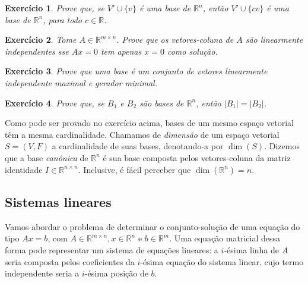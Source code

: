 \documentclass[]{article}
\newtheorem{exercicio}{Exercício}
\numberwithin{equation}{section}
\begin{document}
\begin{exercicio}
	Prove que, se $V' \cup \{v\}$ é uma base de $\mathbb{R}^n$, então $V' \cup \{cv\}$ é uma base de $\mathbb{R}^n$, para todo $c \in \mathbb{R}$.
\end{exercicio}

\begin{exercicio}
	Tome $A \in \mathbb{R}^{m \times n}$. Prove que os vetores-coluna de $A$ são linearmente independentes sse $Ax = 0$ tem apenas $x = 0$ como solução.
\end{exercicio}

\begin{exercicio}
	Prove que uma base é um conjunto de vetores linearmente independente maximal e gerador minimal.
\end{exercicio}

\begin{exercicio}
	Prove que, se $B_1$ e $B_2$ são bases de $\mathbb{R}^n$, então $|B_1| = |B_2|$.
\end{exercicio}

Como pode ser provado no exercício acima, bases de um mesmo espaço vetorial têm a mesma cardinalidade. Chamamos de \emph{dimensão} de um espaço vetorial $S = (V, F)$ a cardinalidade de suas bases, denotando-a por $\dim(S)$. Dizemos que a base \emph{canônica} de $\mathbb{R}^n$ é sua base composta pelos vetores-coluna da matriz identidade $I \in \mathbb{R}^{n \times n}$. Inclusive, é fácil perceber que $\dim(\mathbb{R}^n) = n$.

\subsection{Sistemas lineares}

Vamos abordar o problema de determinar o conjunto-solução de uma equação do tipo $Ax = b$, com $A \in \mathbb{R}^{m \times n}, x \in \mathbb{R}^n$ e $b \in \mathbb{R}^m$. Uma equação matricial dessa forma pode representar um sistema de equações lineares: a $i$-ésima linha de $A$ seria composta pelos coeficientes da $i$-ésima equação do sistema linear, cujo termo independente seria a $i$-ésima posição de $b$.
\end{document}
